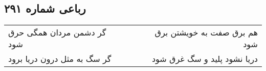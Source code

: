 \begin{center}
\section*{رباعی شماره ۲۹۱}
\label{sec:sh291}
\begin{longtable}{l p{0.5cm} r}
گر دشمن مردان همگی حرق شود
&&
هم برق صفت به خویشتن برق شود
\\
گر سگ به مثل درون دریا برود
&&
دریا نشود پلید و سگ غرق شود
\\
\end{longtable}
\end{center}
